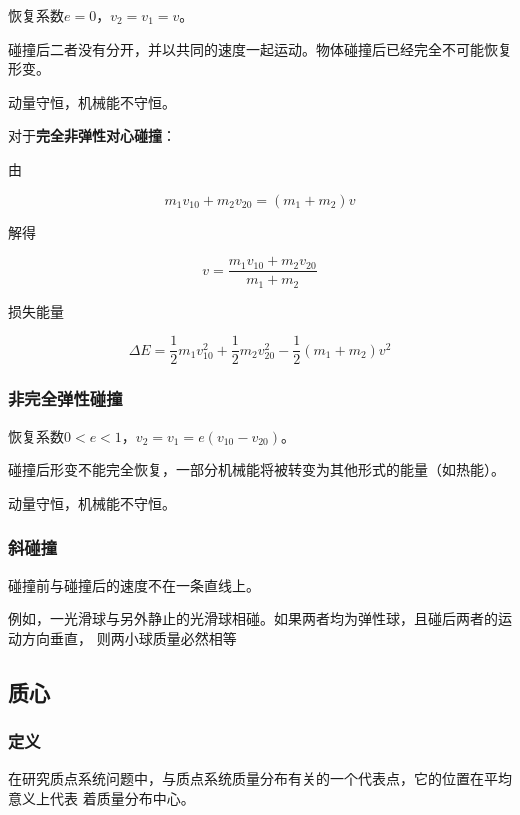 \documentclass[12pt, a4paper]{article}
\numberwithin{equation}{section}
\begin{document}
    恢复系数\(e=0\)，\(v_2=v_1=v\)。
    
    碰撞后二者没有分开，并以共同的速度一起运动。物体碰撞后已经完全不可能恢复形变。

    动量守恒，机械能不守恒。

    对于\textbf{完全非弹性对心碰撞}：

    由

    $$
        m_1 v_{10}+m_2 v_{20}=\left(m_1+m_2\right) v
    $$

    解得

    \begin{equation}
        v=\frac{m_1 v_{10}+m_2 v_{20}}{m_1+m_2}
    \end{equation}

    损失能量

    \begin{equation}
        \Delta E=\frac{1}{2} m_1 v_{10}^2+\frac{1}{2} m_2 v_{20}^2-\frac{1}{2}\left(m_1+m_2\right) v^2
    \end{equation}

\subsubsection{非完全弹性碰撞}

    恢复系数\(0<e<1\)，\(v_2=v_1=e\left(v_{10} - v_{20}\right)\)。

    碰撞后形变不能完全恢复，一部分机械能将被转变为其他形式的能量（如热能）。

    动量守恒，机械能不守恒。

\subsubsection{斜碰撞}

    碰撞前与碰撞后的速度不在一条直线上。

    例如，一光滑球与另外静止的光滑球相碰。如果两者均为弹性球，且碰后两者的运动方向垂直，
    则两小球质量必然相等

\subsection{质心}

\subsubsection{定义}

    在研究质点系统问题中，与质点系统质量分布有关的一个代表点，它的位置在平均意义上代表
    着质量分布中心。
\end{document}
